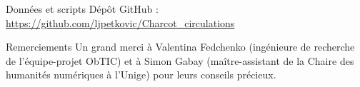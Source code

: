 \begin{frame}{Données et scripts}
Dépôt GitHub : \url{https://github.com/ljpetkovic/Charcot_circulations}
\end{frame}

\begin{frame}{Remerciements}
Un grand merci à Valentina Fedchenko (ingénieure de recherche de l'équipe-projet ObTIC) et à Simon Gabay (maître-assistant de la Chaire des humanités numériques à l'Unige) pour leurs conseils précieux.
\end{frame}